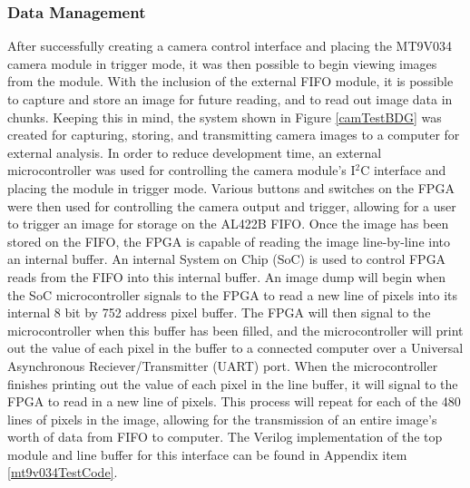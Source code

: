 \subsubsection{Data Management} 
After successfully creating a camera control interface and placing the MT9V034 camera module in trigger mode, it was then possible to begin viewing images from the module. With the inclusion of the external FIFO module, it is  possible to capture and store an image for future reading, and to read out image data in chunks. Keeping this in mind, the system shown in Figure \ref{camTestBDG} was created for capturing, storing, and transmitting camera images to a computer for external analysis. In order to reduce development time, an external microcontroller was used for controlling the camera module's I$^2$C interface and placing the module in trigger mode. Various buttons and switches on the FPGA were then used for controlling the camera output and trigger, allowing for a user to trigger an image for storage on the AL422B FIFO. Once the image has been stored on the FIFO, the FPGA is capable of reading the image line-by-line into an internal buffer. An internal System on Chip (SoC) is used to control FPGA reads from the FIFO into this internal buffer. An image dump will begin when the SoC microcontroller signals to the FPGA to read a new line of pixels into its internal 8 bit by 752 address pixel buffer. The FPGA will then signal to the microcontroller when this buffer has been filled, and the microcontroller will print out the value of each pixel in the buffer to a connected computer over a Universal Asynchronous Reciever/Transmitter (UART) port. When the microcontroller finishes printing out the value of each pixel in the line buffer, it will signal to the FPGA to read in a new line of pixels. This process will repeat for each of the 480 lines of pixels in the image, allowing for the transmission of an entire image's worth of data from FIFO to computer. The Verilog implementation of the top module and line buffer for this interface can be found in Appendix item \ref{mt9v034TestCode}.

